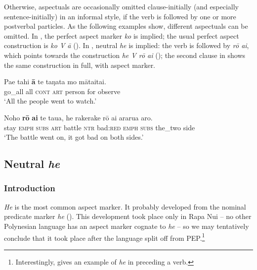 Otherwise, aspectuals are occasionally omitted clause-initially (and especially sen\-tence-initially) in an informal style, if the verb is followed by one or more postverbal particles. As the following examples show, different aspectuals can be omitted. In , the perfect aspect marker \textit{ko} is implied; the usual perfect aspect construction is \textit{ko V {\ꞌ}ā} (). In , neutral \textit{he} is implied: the verb is followed by \textit{rō {\ꞌ}ai}, which points towards the construction \textit{he V rō {\ꞌ}ai} (); the second clause in  shows the same construction in full, with aspect marker. 

\ea\label{ex:7.1}
\gll Pae tahi \textbf{{\ꞌ}ā} te taŋata mo māta{\ꞌ}ita{\ꞌ}i. \\
go\_all all \textsc{cont} \textsc{art} person for observe \\

\glt 
‘All the people went to watch.’ \textstyleExampleref{[R415.785]} 
\z

\ea\label{ex:7.2}
\gll Noho \textbf{rō} \textbf{{\ꞌ}ai} te tau{\ꞌ}a, he rakerake rō {\ꞌ}ai ararua {\ꞌ}aro. \\
stay \textsc{emph} \textsc{subs} \textsc{art} battle \textsc{ntr} bad:\textsc{red} \textsc{emph} \textsc{subs} the\_two side \\

\glt 
‘The battle went on, it got bad on both sides.’ \textstyleExampleref{[R104.074]} 
\z

\subsection{Neutral \textit{he}}\label{sec:7.2.3}
\subsubsection{Introduction}\label{sec:7.2.3.1}

\textit{He} is the most common aspect marker. It probably developed from the nominal predicate marker \textit{he} (). This development took place only in Rapa Nui – no other Polynesian language has an aspect marker cognate to \textit{he} – so we may tentatively conclude that it took place after the language split off from PEP.\footnote{\label{fn:311}Interestingly, \citet[57]{Cook1999} gives an example of \textit{he} in  preceding a verb.} 

